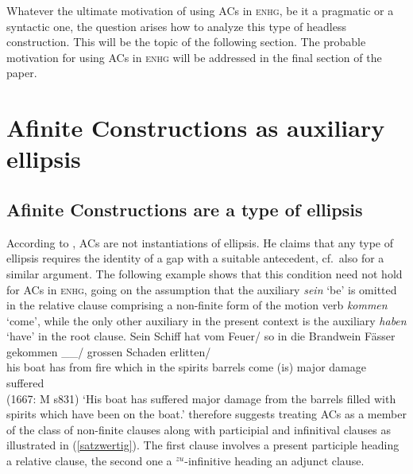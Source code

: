 \documentclass[output=paper,colorlinks,citecolor=brown]{langscibook}
\begin{document}
\noindent
Whatever the ultimate motivation of using ACs in \textsc{enhg}, be it a pragmatic or a syntactic one, the question arises how to analyze this type of headless construction. This will be the topic of the following section. The probable motivation for using ACs in \textsc{enhg} will be addressed in the final section of the paper.

\section{Afinite Constructions as auxiliary ellipsis \label{analysis}}

\subsection{Afinite Constructions are a type of ellipsis \label{arg_ellipsis}}

\largerpage[2]
According to \citet{schroeder85}, ACs are not instantiations of ellipsis. He claims that any type of ellipsis requires the identity of a gap with a suitable antecedent, cf.\ also \citet{biener25} for a similar argument. The following example shows that this condition need not hold for ACs in \textsc{enhg}, going on the assumption that the auxiliary \textit{sein} `be' is omitted in the relative clause comprising a non-finite form of the motion verb \textit{kommen} `come', while the only other auxiliary in the present context is the auxiliary \textit{haben} `have' in the root clause. 
\ea \label{AC}
\gll Sein Schiff hat vom Feuer/ so in die Brandwein Fässer gekommen \_\_/ grossen Schaden erlitten/ \\ his boat has from fire which in the spirits barrels come (is) major damage suffered \\ \hfill (1667: M s831)
\glt `His boat has suffered major damage from the barrels filled with spirits which have been on the boat.'
\z
\citet{schroeder85} therefore suggests treating ACs as a member of the class of non-finite clauses
along with participial and infinitival clauses as illustrated in (\ref{satzwertig}). The first
clause involves a present participle heading a relative clause, the second one a $^{zu}$-infinitive
heading an adjunct clause.
\end{document}
